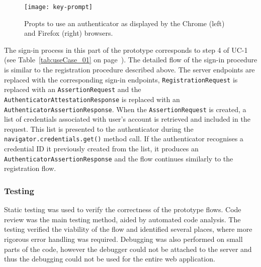 \begin{figure}[htb]
    \centering
    \texttt{[image: key-prompt]}
    \caption{Propts to use an authenticator as displayed by the Chrome (left) and Firefox (right) browsers.}
    \label{fig:key-prompts}
\end{figure}

The sign-in process in this part of the prototype corresponds to step 4
of UC-1 (see Table~\ref{tab:useCase_01} on page~\pageref{tab:useCase_01}). The detailed flow of the sign-in procedure is similar to the registration procedure described above. The server endpoints are replaced with the corresponding sign-in endpoints, \texttt{RegistrationRequest} is replaced with an \texttt{AssertionRequest} and the \texttt{AuthenticatorAttestationResponse} is replaced with an \texttt{AuthenticatorAssertionResponse}. When the \texttt{AssertionRequest} is created, a list of credentials associated with user's account is retrieved and included in the request. This list is presented to the authenticator during the \texttt{navigator.credentials.get()} method call. If the authenticator recognises a credential ID it previously created from the list, it produces an \texttt{AuthenticatorAssertionResponse} and the flow continues similarly to the registration flow.

\subsubsection{Testing}
Static testing was used to verify the correctness of the prototype flows. Code review was the main testing method, aided by automated code analysis. The testing verified the viability of the flow and identified several places, where more rigorous error handling was required. Debugging was also performed on small parts of the code, however the debugger could not be attached to the server and thus the debugging could not be used for the entire web application.